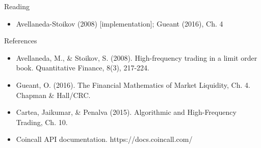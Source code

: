 \documentclass[aspectratio=169,10pt]{beamer}
\begin{document}
\begin{frame}{Reading}
\begin{itemize}
  \item Avellaneda-Stoikov (2008) [implementation]; Gueant (2016), Ch. 4
\end{itemize}
\end{frame}

\begin{frame}{References}
\scriptsize\begin{itemize}\setlength{\itemsep}{3pt}
  \item Avellaneda, M., \& Stoikov, S. (2008). High-frequency trading in a limit order book. Quantitative Finance, 8(3), 217-224.
  \item Gueant, O. (2016). The Financial Mathematics of Market Liquidity, Ch. 4. Chapman \& Hall/CRC.
  \item Cartea, Jaikumar, \& Penalva (2015). Algorithmic and High-Frequency Trading, Ch. 10.
  \item Coincall API documentation. https://docs.coincall.com/
\end{itemize}
\end{frame}
\end{document}
